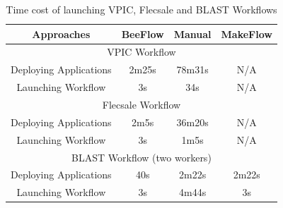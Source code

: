 \begin{table}[]
\centering
\caption{Time cost of launching VPIC, Flecsale and BLAST Workflows}
\label{tc}
\begin{tabular}{|c|c|c|c|}
\hline
Approaches             & BeeFlow & Manual & MakeFlow \\ \hline
\multicolumn{4}{|c|}{VPIC Workflow}                  \\ \hline
Deploying Applications & 2m25s   & 78m31s & N/A      \\ \hline
Launching Workflow     & 3s      & 34s    & N/A      \\ \hline
\multicolumn{4}{|c|}{Flecsale Workflow}              \\ \hline
Deploying Applications & 2m5s    & 36m20s & N/A      \\ \hline
Launching Workflow     & 3s      & 1m5s   & N/A      \\ \hline
\multicolumn{4}{|c|}{BLAST Workflow (two workers)}                 \\ \hline
Deploying Applications & 40s     & 2m22s  & 2m22s    \\ \hline
Launching Workflow     & 3s      & 4m44s  & 3s       \\ \hline
\end{tabular}

\end{table}



